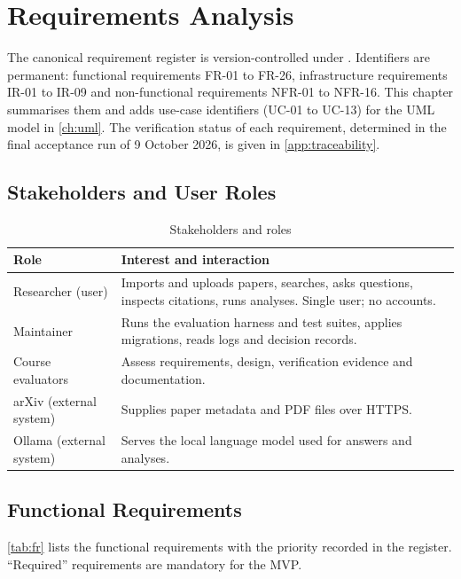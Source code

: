 \chapter{Requirements Analysis}\label{ch:requirements}

The canonical requirement register is version-controlled under . Identifiers are
permanent: functional requirements FR-01 to FR-26, infrastructure requirements IR-01 to IR-09 and non-functional
requirements NFR-01 to NFR-16. This chapter summarises them and adds use-case identifiers (UC-01 to UC-13) for
the UML model in \autoref{ch:uml}. The verification status of each requirement, determined in the final
acceptance run of 9 October 2026, is given in \autoref{app:traceability}.

\section{Stakeholders and User Roles}

\begin{table}[htbp]
  \centering
  \caption{Stakeholders and roles}\label{tab:stakeholders}
  \begin{tabularx}{\textwidth}{@{}lL@{}}
    \toprule
    \textbf{Role} & \textbf{Interest and interaction} \\
    \midrule
    Researcher (user) & Imports and uploads papers, searches, asks questions, inspects citations, runs analyses. Single
      user; no accounts. \\
    Maintainer & Runs the evaluation harness and test suites, applies migrations, reads logs and decision records. \\
    Course evaluators & Assess requirements, design, verification evidence and documentation. \\
    arXiv (external system) & Supplies paper metadata and PDF files over HTTPS. \\
    Ollama (external system) & Serves the local language model used for answers and analyses. \\
    \bottomrule
  \end{tabularx}
\end{table}

\section{Functional Requirements}

\autoref{tab:fr} lists the functional requirements with the priority recorded in the register. ``Required''
requirements are mandatory for the MVP.

